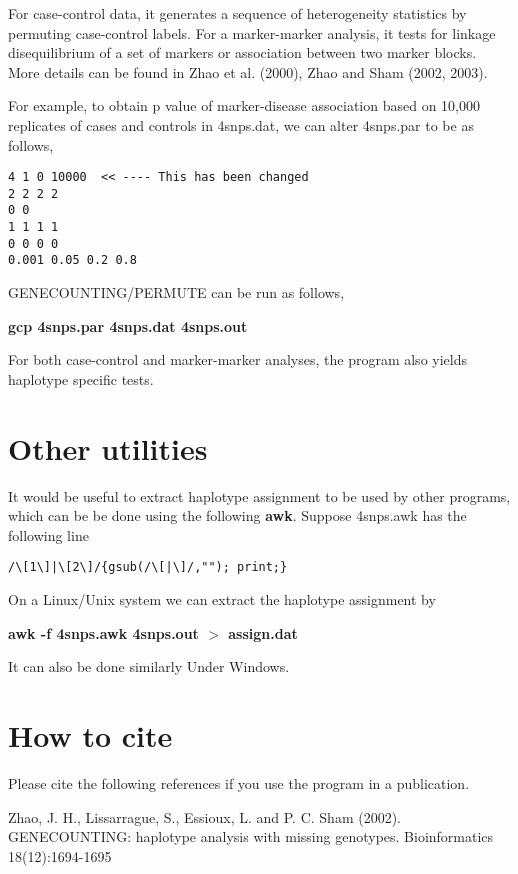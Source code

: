 \documentclass[11pt]{article}
\begin{document}
\medskip\noindent For case-control data, it generates a sequence of
heterogeneity statistics by permuting case-control labels. For a
marker-marker analysis, it tests for linkage disequilibrium of a set
of markers or association between two marker blocks. More details
can be found in Zhao et al. (2000), Zhao and Sham (2002, 2003).

\medskip\noindent For example, to obtain p value of marker-disease
association based on 10,000 replicates of cases and controls in
4snps.dat, we can alter 4snps.par to be as follows,

\begin{verbatim}
4 1 0 10000  << ---- This has been changed
2 2 2 2
0 0
1 1 1 1
0 0 0 0
0.001 0.05 0.2 0.8
\end{verbatim}

\medskip\noindent GENECOUNTING/PERMUTE can be run as follows,

\medskip
{\bf gcp 4snps.par 4snps.dat 4snps.out}
\medskip

\medskip\noindent For both case-control and marker-marker analyses, the
program also yields haplotype specific tests.


\section{Other utilities}

\medskip\noindent It would be useful to extract haplotype assignment to be
used by other programs, which can be be done using the following
{\bf awk}. Suppose 4snps.awk has the following line

\begin{verbatim}
/\[1\]|\[2\]/{gsub(/\[|\]/,""); print;}
\end{verbatim}

\medskip\noindent On a Linux/Unix system we can extract the haplotype
assignment by

\medskip
{\bf awk -f 4snps.awk 4snps.out $>$ assign.dat}
\medskip

\noindent It can also be done similarly Under Windows.


\section{How to cite}

\medskip\noindent Please cite the following references if you use the
program in a publication.

\medskip\noindent
Zhao, J. H., Lissarrague, S., Essioux, L. and P. C. Sham (2002).
GENECOUNTING: haplotype analysis with missing genotypes.
Bioinformatics 18(12):1694-1695
\end{document}
